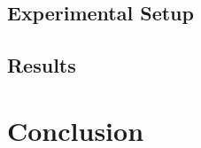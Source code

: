 \documentclass{kecsmstr}
\begin{document}
\section{Experimental Setup}

\section{Results}

\chapter{Conclusion}
\label{chap:conclusion}

 \emptypage

\appendix




 \emptypage

\end{document}
